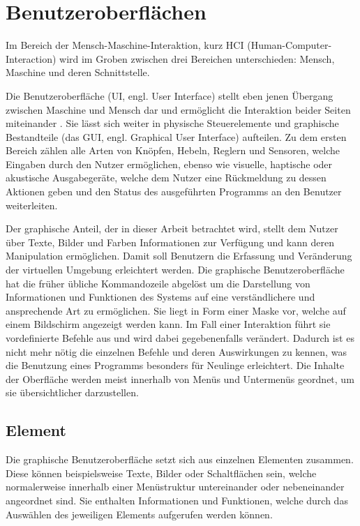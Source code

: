 	\section{Benutzeroberflächen}
		Im Bereich der Mensch-Maschine-Interaktion, kurz HCI (Human-Computer-Interaction) wird im Groben zwischen drei Bereichen unterschieden: Mensch, Maschine und deren Schnittstelle.
		
		
		Die Benutzeroberfläche (UI, engl. User Interface) stellt eben jenen Übergang zwischen Maschine und Mensch dar und ermöglicht die Interaktion beider Seiten miteinander \cite{GUI}.
		Sie lässt sich weiter in physische Steuerelemente und graphische Bestandteile (das GUI, engl. Graphical User Interface) aufteilen. Zu dem ersten Bereich zählen alle Arten von Knöpfen, Hebeln, Reglern und Sensoren, welche Eingaben durch den Nutzer ermöglichen, ebenso wie visuelle, haptische oder akustische Ausgabegeräte, welche dem Nutzer eine Rückmeldung zu dessen Aktionen geben und den Status des ausgeführten Programms an den Benutzer weiterleiten.
		
		
		Der graphische Anteil, der in dieser Arbeit betrachtet wird, stellt dem Nutzer über Texte, Bilder und Farben Informationen zur Verfügung und kann deren Manipulation ermöglichen. Damit soll Benutzern die Erfassung und Veränderung der virtuellen Umgebung erleichtert werden.
		Die graphische Benutzeroberfläche hat die früher übliche Kommandozeile abgelöst um die Darstellung von Informationen und Funktionen des Systems auf eine verständlichere und ansprechende Art zu ermöglichen. Sie liegt in Form einer Maske vor, welche auf einem Bildschirm angezeigt werden kann. Im Fall einer Interaktion führt sie vordefinierte Befehle aus und wird dabei gegebenenfalls verändert. Dadurch ist es nicht mehr nötig die einzelnen Befehle und deren Auswirkungen zu kennen, was die Benutzung eines Programms besonders für Neulinge erleichtert.
		Die Inhalte der Oberfläche werden meist innerhalb von Menüs und Untermenüs geordnet, um sie übersichtlicher darzustellen.\cite{GUI}
	
		\subsection{Element}
			Die graphische Benutzeroberfläche setzt sich aus einzelnen Elementen zusammen. Diese können beispielsweise Texte, Bilder oder Schaltflächen sein, welche normalerweise innerhalb einer Menüstruktur untereinander oder nebeneinander angeordnet sind. Sie enthalten Informationen und Funktionen, welche durch das Auswählen des jeweiligen Elements aufgerufen werden können.
	
